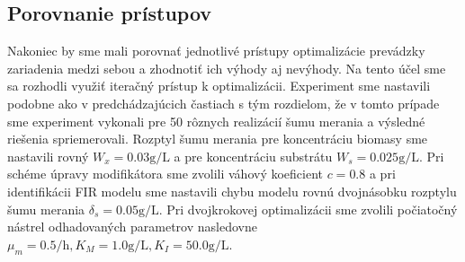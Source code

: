 \subsection{Porovnanie prístupov}
Nakoniec by sme mali porovnať jednotlivé prístupy optimalizácie prevádzky zariadenia medzi sebou a zhodnotiť ich výhody aj nevýhody. Na tento účel sme sa rozhodli využiť iteračný prístup k optimalizácii. Experiment sme nastavili podobne ako v predchádzajúcich častiach s tým rozdielom, že v tomto prípade sme experiment vykonali pre 50 rôznych realizácií šumu merania a výsledné riešenia spriemerovali. Rozptyl šumu merania pre koncentráciu biomasy sme nastavili rovný $ W_{x} = 0.03\si{\gram\per\liter} $ a pre koncentráciu substrátu $ W_{s} = 0.025\si{\gram\per\liter} $. Pri schéme úpravy modifikátora sme zvolili váhový koeficient $ c = 0.8 $ a pri identifikácii FIR modelu sme nastavili chybu modelu rovnú dvojnásobku rozptylu šumu merania $ \delta_{s} = 0.05\si{\gram\per\liter} $. Pri dvojkrokovej optimalizácii sme zvolili počiatočný nástrel odhadovaných parametrov nasledovne $ \mu_{m} = 0.5\si{\per\hour}, K_{M} = 1.0\si{\gram\per\liter}, K_{I} = 50.0\si{\gram\per\liter} $. 

